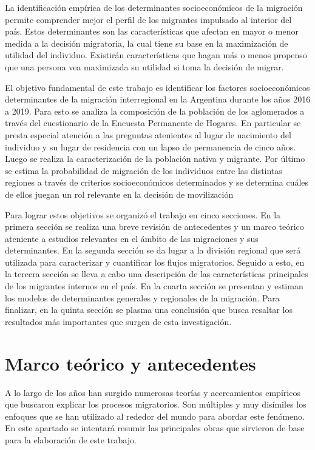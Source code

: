 \documentclass[12pt,a4paper]{article}
\begin{document}
La identificación empírica de los determinantes socioeconómicos de la migración permite comprender mejor el perfil de los migrantes impulsado al interior del país. Estos determinantes son las características que afectan en mayor o menor medida a la decisión migratoria, la cual tiene su base en la maximización de utilidad del individuo. Existirán características que hagan más o menos propenso que una persona vea maximizada su utilidad si toma la decisión de migrar.

El objetivo fundamental de este trabajo es identificar los factores socioeconómicos determinantes de la migración interregional en la Argentina durante los años 2016 a 2019. Para esto se analiza la composición de la población de los aglomerados a través del cuestionario de la Encuesta Permanente de Hogares. En particular se presta especial atención a las preguntas atenientes al lugar de nacimiento del individuo y su lugar de residencia con un lapso de permanencia de cinco años. Luego se realiza la caracterización de la población nativa y migrante. Por último se estima la probabilidad de migración de los individuos entre las distintas regiones a través de criterios socioeconómicos determinados y se determina cuáles de ellos juegan un rol relevante en la decisión de movilización

Para lograr estos objetivos se organizó el trabajo en cinco secciones. En la primera sección se realiza una breve revisión de antecedentes y un marco teórico ateniente a estudios relevantes en el ámbito de las migraciones y sus determinantes. En la segunda sección se da lugar a la división regional que será utilizada para caracterizar y cuantificar los flujos migratorios. Seguido a esto, en la tercera sección se lleva a cabo una descripción de las características principales de los migrantes internos en el país. En la cuarta sección se presentan y estiman los modelos de determinantes generales y regionales de la migración. Para finalizar, en la quinta sección se plasma una conclusión que busca resaltar los resultados más importantes que surgen de esta investigación.

\newpage
\section{Marco teórico y antecedentes}
A lo largo de los años han surgido numerosas teorías y acercamientos empíricos que buscaron explicar los procesos migratorios. Son múltiples y muy disímiles los enfoques que se han utilizado al rededor del mundo para abordar este fenómeno. En este apartado se intentará resumir las principales obras que sirvieron de base para la elaboración de este trabajo.
\end{document}

